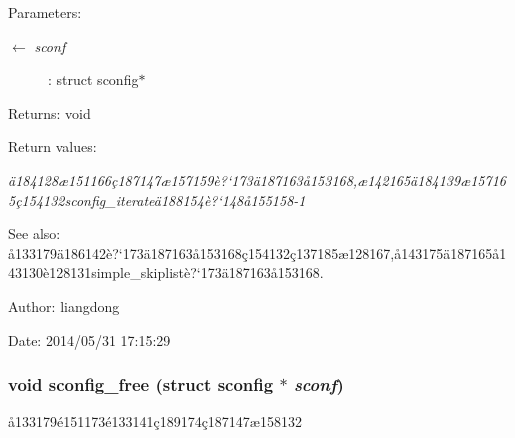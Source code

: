 \begin{Desc}
\item[Parameters:]
\begin{description}
\item[\mbox{$\leftarrow$} {\em sconf}]: struct sconfig$\ast$ \end{description}
\end{Desc}
\begin{Desc}
\item[Returns:]void \end{Desc}
\begin{Desc}
\item[Return values:]
\begin{description}
\item[{\em \"{a}184128\ae{}151166\c{c}187147\ae{}157159\`{e}?`173\"{a}187163\aa{}153168,\ae{}142165\"{a}184139\ae{}157165\c{c}154132sconfig\_\-iterate\"{a}188154\`{e}?`148\aa{}155158-1}]\end{description}
\end{Desc}
\begin{Desc}
\item[See also:]\aa{}133179\"{a}186142\`{e}?`173\"{a}187163\aa{}153168\c{c}154132\c{c}137185\ae{}128167,\aa{}143175\"{a}187165\aa{}143130\`{e}128131simple\_\-skiplist\`{e}?`173\"{a}187163\aa{}153168. \end{Desc}
\begin{Desc}
\item[Author:]liangdong \end{Desc}
\begin{Desc}
\item[Date:]2014/05/31 17:15:29 \end{Desc}
\subsubsection{\setlength{\rightskip}{0pt plus 5cm}void sconfig\_\-free (struct sconfig $\ast$ {\em sconf})}\label{sconfig_8h_a1}


\aa{}133179\'{e}151173\'{e}133141\c{c}189174\c{c}187147\ae{}158132 

